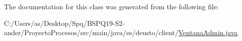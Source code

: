 The documentation for this class was generated from the following file\+:\begin{DoxyCompactItemize}
\item 
C\+:/\+Users/as/\+Desktop/\+Spq/\+B\+S\+P\+Q19-\/\+S2-\/ander/\+Proyecto\+Procesos/src/main/java/es/deusto/client/\mbox{\hyperlink{_ventana_admin_8java}{Ventana\+Admin.\+java}}\end{DoxyCompactItemize}

